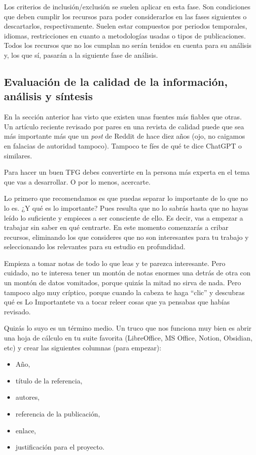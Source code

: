 Los criterios de inclusión/exclusión se suelen aplicar en esta fase. Son condiciones que deben cumplir los recursos para poder considerarlos en las fases siguientes o descartarlos, respectivamente. Suelen estar compuestos por periodos temporales, idiomas, restricciones en cuanto a metodologías usadas o tipos de publicaciones. Todos los recursos que no los cumplan no serán tenidos en cuenta para su análisis y, los que sí, pasarán a la siguiente fase de análisis.

\subsection{Evaluación de la calidad de la información, análisis y síntesis}

En la sección anterior has visto que existen unas fuentes más fiables que otras. Un artículo reciente revisado por pares en una revista de calidad puede que sea más importante más que un \textit{post} de Reddit de hace diez años (ojo, no caigamos en falacias de autoridad tampoco). Tampoco te fíes de qué te dice ChatGPT o similares.

Para hacer un buen TFG debes convertirte en la persona más experta en el tema que vas a desarrollar. O por lo menos, acercarte.

Lo primero que recomendamos es que puedas separar lo importante de lo que no lo es. ¿Y qué es lo importante?  Pues resulta que no lo sabrás hasta que no hayas leído lo suficiente y empieces a ser consciente de ello. Es decir, vas a empezar a trabajar sin saber en qué centrarte. En este momento comenzarás a cribar recursos, eliminando los que consideres que no son interesantes para tu trabajo y seleccionando los relevantes para su estudio en profundidad.

Empieza a tomar notas de todo lo que leas y te parezca interesante. Pero cuidado, no te interesa tener un montón de notas enormes una detrás de otra con un montón de datos vomitados, porque quizás la mitad no sirva de nada. Pero tampoco algo muy críptico, porque cuando la cabeza te haga ``clic'' y descubras qué es Lo Importante\texttrademark  te va a tocar releer cosas que ya pensabas que habías revisado. 

Quizás lo suyo es un término medio. Un truco que nos funciona muy bien es abrir una hoja de cálculo en tu suite favorita (LibreOffice, MS Office, Notion, Obsidian, etc) y crear las siguientes columnas (para empezar):
\begin{itemize}
    \item Año,
    \item título de la referencia,
    \item autores,
    \item referencia de la publicación,
    \item enlace,
    \item justificación para el proyecto.
\end{itemize}

